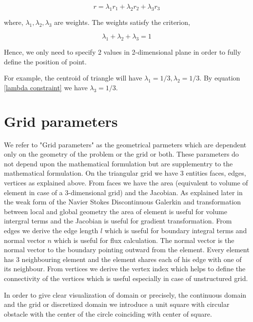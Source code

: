 \documentclass[a4paper,12pt]{book}
\begin{document}
\begin{equation}\label{barycentric point}
r = \lambda_1 r_1 + \lambda_2 r_2 + \lambda_3 r_3
\end{equation}

where, $\lambda_1, \lambda_2, \lambda_3$ are weights. The weights satisfy the criterion,

\begin{equation}\label{lambda constraint}
\lambda_1 + \lambda_2 + \lambda_3 = 1
\end{equation}

Hence, we only need to specify 2 values in 2-dimensional plane in order to fully define the position of point.

For example, the centroid of triangle will have $\lambda_1 = 1/3, \lambda_2 = 1/3$. By equation \eqref{lambda constraint} we have $\lambda_3=1/3$.

\section{Grid parameters}

We refer to "Grid parameters" as the geometrical parmeters which are dependent only on the geometry of the problem or the grid or both. These parameters do not depend upon the mathematical formulation but are supplementry to the mathematical formulation. On the triangular grid we have 3 entities faces, edges, vertices as explained above. From faces we have the area (equivalent to volume of element in case of a 3-dimensional grid) and the Jacobian. As explained later in the weak form of the Navier Stokes Discontinuous Galerkin and transformation between local and global geometry the area of element is useful for volume intergral terms and the Jacobian is useful for gradient transformation. From edges we derive the edge length $l$ which is useful for boundary integral terms and normal vector $n$ which is useful for flux calculation. The normal vector is the normal vector to the boundary pointing outward from the element. Every element has 3 neighbouring element and the element shares each of his edge with one of its neighbour. From vertices we derive the vertex index which helps to define the connectivity of the vertices which is useful especially in case of unstructured grid. 

In order to give clear visualization of domain or precisely, the continuous domain and the grid or discretized domain we introduce a unit square with circular obstacle with the center of the circle coinciding with center of square. 
\end{document}
